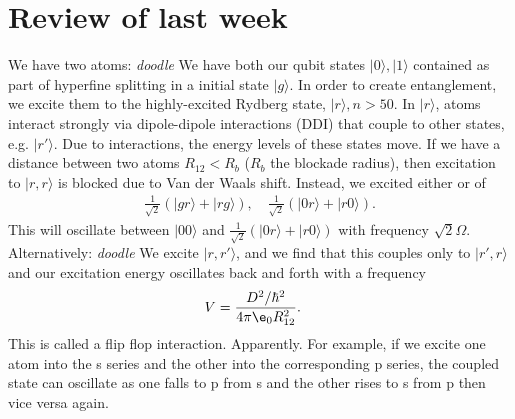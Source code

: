 \documentclass[lasers.tex]{subfiles}
\begin{document}
\section{Review of last week}
We have two atoms:
\emph{doodle}
We have both our qubit states $|0\rangle,|1\rangle$ contained as part of hyperfine splitting in a initial state $|g\rangle$.
In order to create entanglement, we excite them to the highly-excited Rydberg state, $|r\rangle,n>50$.
In $|r\rangle$, atoms interact strongly via dipole-dipole interactions (DDI) that couple to other states, e.g. $|r'\rangle$.
Due to interactions, the energy levels of these states move. 
If we have a distance between two atoms $R_{12}<R_b$ ($R_b$ the blockade radius), then excitation to $|r,r\rangle$ is blocked due to Van der Waals shift.
Instead, we excited either or of
\begin{align*}
    \frac{1}{\sqrt{2}}\left(|gr\rangle+|rg\rangle\right),\quad \frac{1}{\sqrt{2}}\left(|0r\rangle+|r0\rangle\right).
\end{align*}
This will oscillate between $|00\rangle$ and $\frac{1}{\sqrt{2}}\left(|0r\rangle+|r0\rangle\right)$ with frequency $\sqrt{2}\Omega$.
Alternatively:
\emph{doodle}
We excite $|r,r'\rangle$, and we find that this couples only to $|r',r\rangle$ and our excitation energy oscillates back and forth with a frequency
\begin{align}
    V &= \frac{D^2/\hbar^2}{4\pi\e_0 R_{12}^2}.
\end{align}
This is called a flip flop interaction. Apparently. 
For example, if we excite one atom into the s series and the other into the corresponding p series, the coupled state can oscillate as one falls to p from s and the other rises to s from p then vice versa again. 
\end{document}
